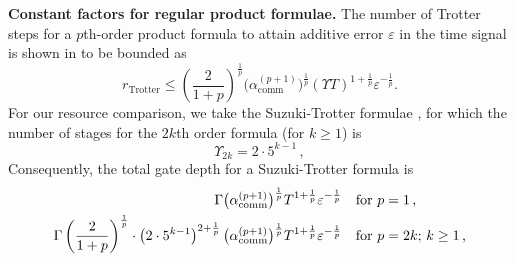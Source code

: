 \textbf{Constant factors for regular product formulae.} The number of Trotter steps for a $p$th-order product formula to attain additive error $\varepsilon$ in the time signal is shown in \cite[Appendix C]{childs2021TheoryTrotter} to be bounded as
\begin{equation}\label{eq:trotter-steps}
r_{\mathrm{Trotter}} \leq \left(\frac{2}{1+p}\right)^{\frac{1}{p}}
\bigl(\alpha_{\mathrm{comm}}^{(p+1)}\bigr)^{\frac{1}{p}}
(\Upsilon T)^{1+\frac{1}{p}}
\varepsilon^{-\frac{1}{p}}
.
\end{equation}
For our resource comparison, we take the Suzuki-Trotter formulae \cite{suzuki1991general}, for which the number of stages for the $2k$th order formula (for $k\geq 1$) is
\begin{equation}
    \Upsilon_{2k} = 2 \cdot 5^{k-1}\,,
\end{equation}
Consequently, the total gate depth for a Suzuki-Trotter formula is 
\begin{align}
    \Gamma
\bigl(\alpha_{\mathrm{comm}}^{(p+1)}\bigr)^{\frac{1}{p}}
T^{1+\frac{1}{p}}
\varepsilon^{-\frac{1}{p}} \quad &\text{for $p=1$\,,}\\
\Gamma \left(\frac{2}{1+p}\right)^{\frac{1}{p}} \cdot \left( 2 \cdot 5^{k-1} \right)^{2+\frac{1}{p}}
\bigl(\alpha_{\mathrm{comm}}^{(p+1)}\bigr)^{\frac{1}{p}}
T^{1+\frac{1}{p}}
\varepsilon^{-\frac{1}{p}} \quad &\text{for $p=2k$; $k \geq 1$\,,}
\end{align}

\medskips

